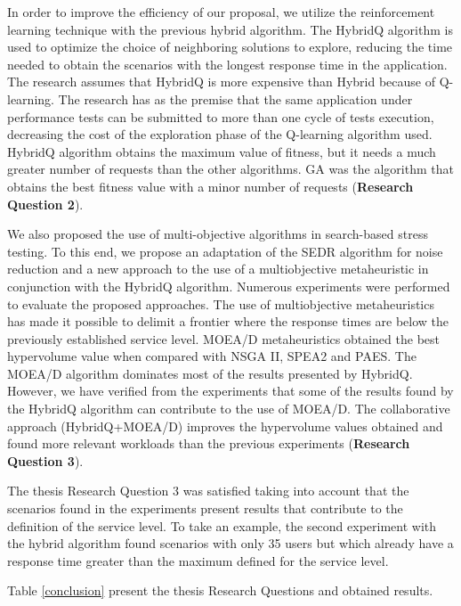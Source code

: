 \documentclass[espaco=umemeio,chapter=TITLE,twoside,openright]{abnt}
\begin{document}
In order to improve the efficiency of our proposal, we utilize the reinforcement learning technique with the previous hybrid algorithm. The HybridQ algorithm is used to optimize the choice of neighboring solutions to explore, reducing the time needed to obtain the scenarios with the longest response time in the application. The research assumes that HybridQ is more expensive than Hybrid because of Q-learning. The research has as the premise that the same application under performance tests can be submitted to more than one cycle of tests execution, decreasing the cost of the exploration phase of the Q-learning algorithm used. HybridQ algorithm obtains the maximum value of fitness, but it needs a much greater number of requests than the other algorithms. GA was the algorithm that obtains the best fitness value with a minor number of requests (\textbf{Research Question 2}). 


We also proposed the use of multi-objective algorithms in search-based stress testing. To this end, we propose an adaptation of the SEDR algorithm for noise reduction and a new approach to the use of a multiobjective metaheuristic in conjunction with the HybridQ algorithm. Numerous experiments were performed to evaluate the proposed approaches. The use of multiobjective metaheuristics has made it possible to delimit a frontier where the response times are below the previously established service level. MOEA/D metaheuristics obtained the best hypervolume value when compared with NSGA II, SPEA2 and PAES. The MOEA/D algorithm dominates most of the results presented by HybridQ. However, we have verified from the experiments that some of the results found by the HybridQ algorithm can contribute to the use of MOEA/D. The collaborative approach (HybridQ+MOEA/D) improves the hypervolume values obtained and found more relevant workloads than the previous experiments (\textbf{Research Question 3}). 

The thesis Research Question 3 was satisfied taking into account that the scenarios found in the experiments present results that contribute to the definition of the service level. To take an example, the second experiment with the hybrid algorithm found scenarios with only 35 users but which already have a response time greater than the maximum defined for the service level.

Table \ref{conclusion} present the thesis Research Questions and obtained results.
\end{document}
